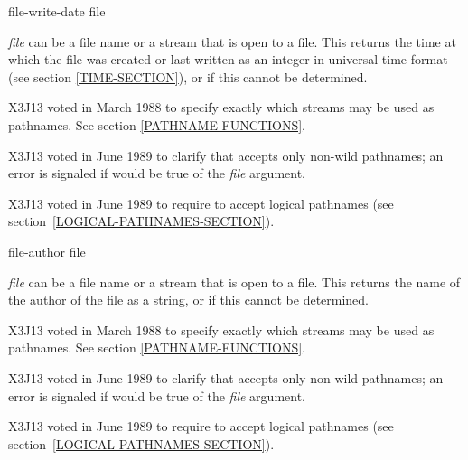\begin{defun}[Function]
file-write-date file

\emph{file} can be a file name or a stream that is open to a file.
This returns the time at which the file was created
or last written as an integer in
universal time format (see section \ref{TIME-SECTION}),
or {\false} if this cannot be determined.

\begin{new}
X3J13 voted in March 1988
to specify exactly which streams may be used as pathnames.
See section \ref{PATHNAME-FUNCTIONS}.
\end{new}

\begin{newer}
X3J13 voted in June 1989 
to clarify that  accepts only non-wild pathnames;
an error is signaled if  would be true of
the \emph{file} argument.
\end{newer}

\begin{newer}
X3J13 voted in June 1989  to require 
to accept logical pathnames (see section~\ref{LOGICAL-PATHNAMES-SECTION}).
\end{newer}
\end{defun}

\begin{defun}[Function]
file-author file

\emph{file} can be a file name or a stream that is open to a file.
This returns the name of the author of the file as a string,
or {\false} if this cannot be determined.

\begin{new}
X3J13 voted in March 1988
to specify exactly which streams may be used as pathnames.
See section \ref{PATHNAME-FUNCTIONS}.
\end{new}

\begin{newer}
X3J13 voted in June 1989 
to clarify that  accepts only non-wild pathnames;
an error is signaled if  would be true of
the \emph{file} argument.
\end{newer}

\begin{newer}
X3J13 voted in June 1989  to require 
to accept logical pathnames (see section~\ref{LOGICAL-PATHNAMES-SECTION}).
\end{newer}
\end{defun}


